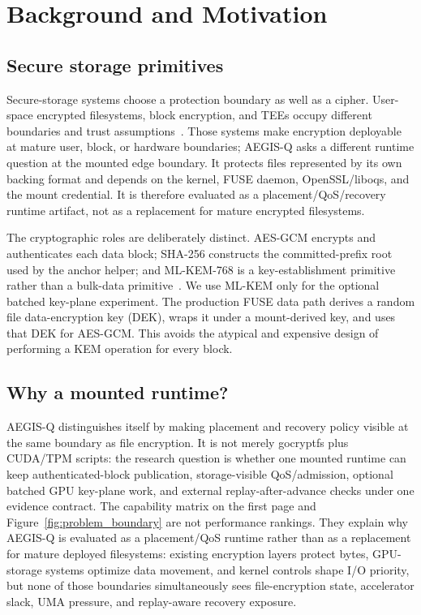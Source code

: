 \section{Background and Motivation}
\label{sec:background}

\subsection{Secure storage primitives}
\label{sec:bg_sim}

Secure-storage systems choose a protection boundary as well as a cipher.  User-space encrypted filesystems, block encryption, and TEEs occupy different boundaries and trust assumptions~\cite{gocryptfs, dmcrypt, optee}.  Those systems make encryption deployable at mature user, block, or hardware boundaries; AEGIS-Q asks a different runtime question at the mounted edge boundary.  It protects files represented by its own backing format and depends on the kernel, FUSE daemon, OpenSSL/liboqs, and the mount credential.  It is therefore evaluated as a placement/QoS/recovery runtime artifact, not as a replacement for mature encrypted filesystems.

The cryptographic roles are deliberately distinct.  AES-GCM encrypts and authenticates each data block; SHA-256 constructs the committed-prefix root used by the anchor helper; and ML-KEM-768 is a key-establishment primitive rather than a bulk-data primitive~\cite{mlkem, sha256}.  We use ML-KEM only for the optional batched key-plane experiment.  The production FUSE data path derives a random file data-encryption key (DEK), wraps it under a mount-derived key, and uses that DEK for AES-GCM.  This avoids the atypical and expensive design of performing a KEM operation for every block.

\subsection{Why a mounted runtime?}

AEGIS-Q distinguishes itself by making placement and recovery policy visible at the same boundary as file encryption.  It is not merely gocryptfs plus CUDA/TPM scripts: the research question is whether one mounted runtime can keep authenticated-block publication, storage-visible QoS/admission, optional batched GPU key-plane work, and external replay-after-advance checks under one evidence contract.  The capability matrix on the first page and Figure~\ref{fig:problem_boundary} are not performance rankings.  They explain why AEGIS-Q is evaluated as a placement/QoS runtime rather than as a replacement for mature deployed filesystems: existing encryption layers protect bytes, GPU-storage systems optimize data movement, and kernel controls shape I/O priority, but none of those boundaries simultaneously sees file-encryption state, accelerator slack, UMA pressure, and replay-aware recovery exposure.

